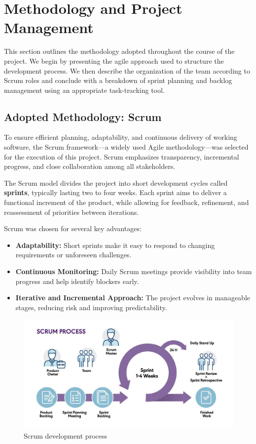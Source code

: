 \section{Methodology and Project Management}

This section outlines the methodology adopted throughout the course of the project. We begin by presenting the agile approach used to structure the development process. We then describe the organization of the team according to Scrum roles and conclude with a breakdown of sprint planning and backlog management using an appropriate task-tracking tool.

\subsection{Adopted Methodology: Scrum}

To ensure efficient planning, adaptability, and continuous delivery of working software, the Scrum framework—a widely used Agile methodology—was selected for the execution of this project. Scrum emphasizes transparency, incremental progress, and close collaboration among all stakeholders.

The Scrum model divides the project into short development cycles called \textbf{sprints}, typically lasting two to four weeks. Each sprint aims to deliver a functional increment of the product, while allowing for feedback, refinement, and reassessment of priorities between iterations.

Scrum was chosen for several key advantages:
\begin{itemize}
  \item \textbf{Adaptability:} Short sprints make it easy to respond to changing requirements or unforeseen challenges.
  \item \textbf{Continuous Monitoring:} Daily Scrum meetings provide visibility into team progress and help identify blockers early.
  \item \textbf{Iterative and Incremental Approach:} The project evolves in manageable stages, reducing risk and improving predictability.
\end{itemize}

\begin{figure}[H]
    \centering
    \includegraphics[width=1\textwidth]{images/scrum_process_diagram.jpg}
    \caption{Scrum development process}
    \label{fig:scrum_process}
\end{figure}

